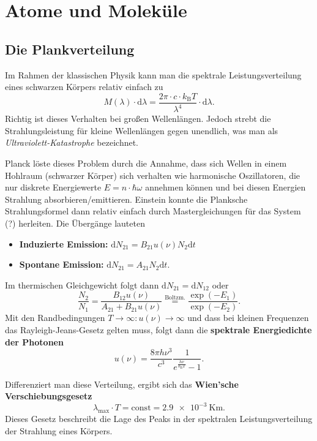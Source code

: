\chapter{Atome und Moleküle}

\section{Die Plankverteilung}
Im Rahmen der klassischen Physik kann man die spektrale Leistungsverteilung eines schwarzen Körpers relativ einfach zu
\begin{equation*}
	M(\lambda)\cdot\text{d}\lambda = \frac{2\pi\cdot c\cdot k_\text{B}T}{\lambda^4}\cdot\text{d}\lambda.
\end{equation*}
Richtig ist dieses Verhalten bei großen Wellenlängen.
Jedoch strebt die Strahlungsleistung für kleine Wellenlängen gegen unendlich, was man als \textit{Ultraviolett-Katastrophe} bezeichnet.

Planck löste dieses Problem durch die Annahme, dass sich Wellen in einem Hohlraum (schwarzer Körper) sich verhalten wie harmonische Oszillatoren, die nur diskrete Energiewerte $E=n\cdot\hbar\omega$ annehmen können und bei diesen Energien Strahlung absorbieren/emittieren.
Einstein konnte die Planksche Strahlungsformel dann relativ einfach durch Mastergleichungen für das System (?) herleiten.
Die Übergänge lauteten
\begin{itemize}
	\item \textbf{Induzierte Emission:} $\text{d}N_{21} = B_{21}u(\nu)N_2\text{d}t$
	\item \textbf{Spontane Emission:} $\text{d}N_{21} = A_{21}N_2\text{d}t$.
\end{itemize}
Im thermischen Gleichgewicht folgt dann $\text{d}N_{21} = \text{d}N_{12}$ oder
\begin{equation*}
	\frac{N_2}{N_1} = \frac{B_{12}u(\nu)}{A_{21}+B_{21}u(\nu)} \stackrel{\text{Boltzm.}}{=} \frac{\exp(-E_1)}{\exp(-E_2)}.
\end{equation*}
Mit den Randbedingungen $T\rightarrow\infty : u(\nu)\rightarrow\infty$ und dass bei kleinen Frequenzen das Rayleigh-Jeans-Gesetz gelten muss, folgt dann die \textbf{spektrale Energiedichte der Photonen}
\begin{equation*}
	u(\nu) = \frac{8\pi h\nu^3}{c^3}\frac{1}{e^{\frac{h\nu}{k_\text{B}T}} - 1}.
\end{equation*}

Differenziert man diese Verteilung, ergibt sich das \textbf{Wien'sche Verschiebungsgesetz}
\begin{equation*}
	\lambda_\text{max}\cdot T = \text{const} = \SI{2.9e-3}{\kelvin\meter}.
\end{equation*}
Dieses Gesetz beschreibt die Lage des Peaks in der spektralen Leistungsverteilung der Strahlung eines Körpers.

